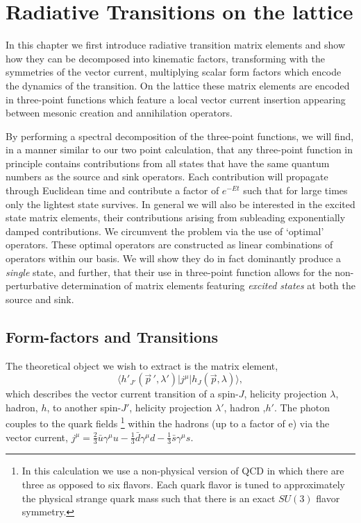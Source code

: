\chapter{Radiative Transitions on the lattice} \label{chap::radTranLattice}

In this chapter we first introduce radiative transition matrix elements and show how they can be decomposed into kinematic factors, transforming with the symmetries of the vector current, multiplying scalar form factors which encode the dynamics of the transition. On the lattice these matrix elements are encoded in three-point functions which feature a local vector current insertion appearing between mesonic creation and annihilation operators. 

By performing a spectral decomposition of the three-point functions, we will find, in a manner similar to our two point calculation,  that any three-point function in principle contains contributions from all states that have the same quantum numbers as the source and sink operators. Each contribution will propagate through Euclidean time and contribute a factor of $e^{-Et}$ such that for large times only the lightest state survives. In general we will also be interested in the excited state matrix elements, their contributions arising from subleading exponentially damped contributions. We circumvent the problem via the use of `optimal' operators. These optimal operators are constructed as linear combinations of operators within our basis. We will show they do in fact dominantly produce a \emph{single} state, and further, that their use in three-point function allows for the non-perturbative determination of matrix elements featuring \emph{excited states} at both the source and sink.


\section{Form-factors and Transitions \label{sec::formfactor}}

The theoretical object we wish to extract is the matrix element, 
\begin{equation}
\langle h'_{J'}(\vec{p}\,',\lambda')|j^\mu | h_J(\vec{p},\lambda) \rangle, 
\end{equation}
 which describes the vector current transition of a spin-$J$, helicity projection $\lambda$, hadron, $h$, to another spin-$J'$, helicity projection $\lambda'$, hadron ,$h'$. The photon couples to the quark fields \footnote{In this calculation we use a non-physical version of QCD in which there are three as opposed to six flavors. Each quark flavor is tuned to approximately the physical strange quark mass such that there is an exact $SU(3)$ flavor symmetry.} within the hadrons (up to a factor of e) via the vector current, $j^\mu = \frac{2}{3}\bar{u}\gamma^\mu u -\frac{1}{3}\bar{d}\gamma^\mu d -\frac{1}{3}\bar{s}\gamma^\mu s $.  
 
